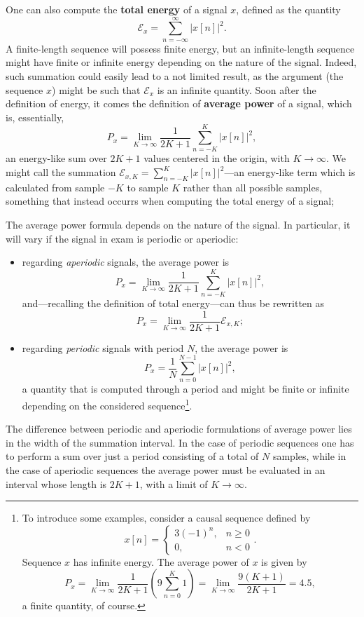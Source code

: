 \documentclass[\documentfontsize, twocolumn]{\classname}
\begin{document}
One can also compute the \textbf{total energy} of a signal $x$, defined as the quantity
\begin{equation}\label{eqn:totalEnergy}
    \mathcal E_x = \sum_{n=-\infty}^{\infty} | x[n] |^2.
\end{equation}
A finite-length se\-quen\-ce will possess finite energy, but an infinite-length se\-quen\-ce might have finite or infinite energy depending on the nature of the signal. Indeed, such summation could easily lead to a not limited result, as the argument (the sequence $x$) might be such that $\mathcal E_x$ is an infinite quantity. Soon after the definition of energy, it comes the definition of \textbf{average power} of a signal, which is, essentially,
\begin{equation}\label{eqn:averagePower}
    P_x = \lim_{K \rightarrow \infty} \frac{1}{2K + 1} \sum_{n = -K}^K |x[n]|^2,
\end{equation}
an energy-like sum over $2K + 1$ values centered in the origin, with $K \rightarrow \infty$. We might call the summation $\mathcal E_{x, K} = \sum_{n=-K}^{K}|x[n]|^2$---an energy-like term which is calculated from sample $-K$ to sample $K$ rather than all possible samples, something that instead occurrs when computing the total energy of a signal;

The average power formula depends on the nature of the signal. In particular, it will vary if the signal in exam is periodic or aperiodic:
\begin{itemize}
    \item regarding \emph{aperiodic} signals, the average power is
        \[ P_x = \lim_{K \rightarrow \infty} \frac{1}{2K + 1} \sum_{n = -K}^K |x[n]|^2, \]
    and---recalling the definition of total energy---can thus be rewritten as
    \[ P_x = \lim_{K \rightarrow \infty} \frac{1}{2K + 1} \mathcal E_{x,K}; \]
    \item regarding \emph{periodic} signals with period $N$, the average power is
        \[P_x = \frac{1}{N} \sum_{n = 0}^{N-1} |x[n]|^2,\] a quantity that is computed through a period and might be finite or infinite depending on the considered sequence\footnote{To introduce some examples, consider a causal se\-quen\-ce defined by \[ x[n] = \left\{\begin{array}{lc}3(-1)^n, & n \geq 0\\ 0, & n < 0\end{array}\right. .\] Se\-quen\-ce $x$ has infinite energy. The average power of $x$ is given by \[P_x = \lim_{K\rightarrow \infty}\frac{1}{2K+1}\left(9\sum_{n=0}^K 1\right) = \lim_{K\rightarrow \infty}\frac{9(K+1)}{2K+1} = 4.5,\] a finite quantity, of course.}.
\end{itemize}
The difference between periodic and aperiodic formulations of average power lies in the width of the summation interval. In the case of periodic sequences one has to perform a sum over just a period consisting of a total of $N$ samples, while in the case of aperiodic sequences the average power must be evaluated in an interval whose length is $2K + 1$, with a limit of $K \rightarrow \infty$.
\end{document}
